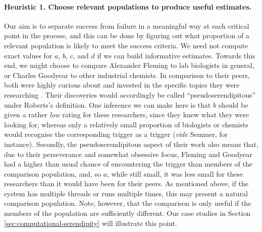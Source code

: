 
\paragraph{Heuristic 1. Choose relevant populations to produce useful estimates.}
\label{heur:1}
Our aim is to separate success from failure in a meaningful way at
each critical point in the process, and this can be done by figuring
out what proportion of a relevant population is likely to meet the
success criteria.  We need not compute exact values for $a$, $b$, $c$,
and $d$ if we can build informative estimates.  Towards this end, we
might choose to compare Alexander Fleming to lab biologists in
general, or Charles Goodyear to other industrial chemists.  In
comparison to their peers, both were highly curious about and invested
in the specific topics they were researching
\cite{fleming,goodyear1855gum}.  Their discoveries would accordingly
be called ``pseudoserendipitous'' under Roberts's
\cite{roberts} definition.  One inference we can make here is
that $b$ should be given a rather \emph{low} rating for these
researchers, since they knew what they were looking for, whereas only
a relatively small proportion of biologists or chemists would
recognise the corresponding trigger as a trigger (\emph{vide} Semmer,
for instance).  Secondly, the pseudoserendipitous aspect of their work
also means that, due to their perseverance and somewhat obsessive
focus, Fleming and Goodyear had a higher than usual chance of
encountering the trigger than members of the comparison population,
and, so $a$, while still small, it was less small for these
researchers than it would have been for their peers.  As mentioned
above, if the system has multiple threads or runs multiple times, this
may present a natural comparison population.  Note, however, that the
comparison is only useful if the members of the population are
sufficiently different.  Our case studies in Section
\ref{sec:computational-serendipity} will illustrate this point.


